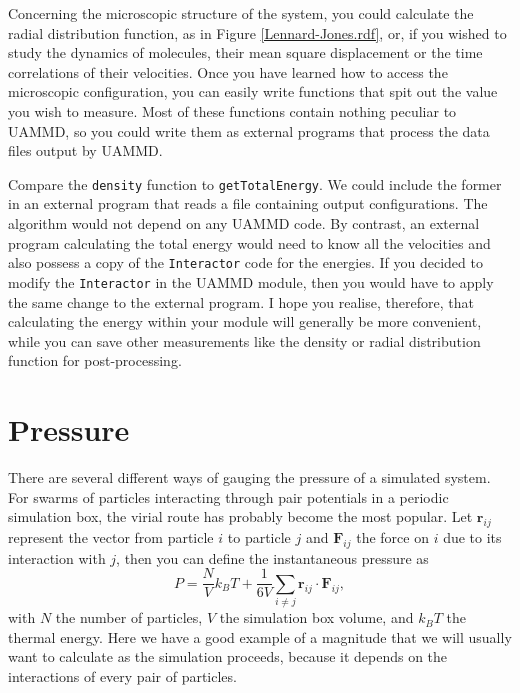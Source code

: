 Concerning the microscopic structure of the system, you could calculate the 
radial distribution function, as in Figure \ref{Lennard-Jones.rdf}, or, if you 
wished to study the dynamics of molecules, their mean square displacement or the 
time correlations of their velocities. Once you have learned how to access the 
microscopic configuration, you can easily write functions that spit out the 
value you wish to measure. Most of these functions contain nothing peculiar to 
UAMMD, so you could write them as external programs that process the data files 
output by UAMMD.

Compare the \texttt{density} function to \texttt{getTotalEnergy}. We could 
include the former in an external program that reads a file containing output 
configurations. The algorithm would not depend on any UAMMD code. By contrast, 
an external program calculating the total energy would need to know all the 
velocities and also possess a copy of the \texttt{Interactor} code for the 
energies. If you decided to modify the \texttt{Interactor} in the UAMMD module, 
then you would have to apply the same change to the external program. I hope you 
realise, therefore, that calculating the energy within your module will 
generally be more convenient, while you can save other measurements like the 
density or radial distribution function for post-processing.

\section{Pressure}

There are several different ways of gauging the pressure of a simulated system. 
For swarms of particles interacting through pair potentials in a periodic 
simulation box, the virial route has probably become the most popular. Let 
$\mathbf{r}_{ij}$ represent the vector from particle $i$ to particle $j$ and 
$\mathbf{F}_{ij}$ the force on $i$ due to its interaction with $j$, then you can 
define the instantaneous pressure as
\begin{equation*}
  P = \frac{N}{V} k_B T
      + \frac{1}{6V} \sum_{i \neq j} \mathbf{r}_{ij} \cdot \mathbf{F}_{ij},
\end{equation*}
with $N$ the number of particles, $V$ the simulation box volume, and $k_B T$ the 
thermal energy. Here we have a good example of a magnitude that we will usually 
want to calculate as the simulation proceeds, because it depends on the 
interactions of every pair of particles.

